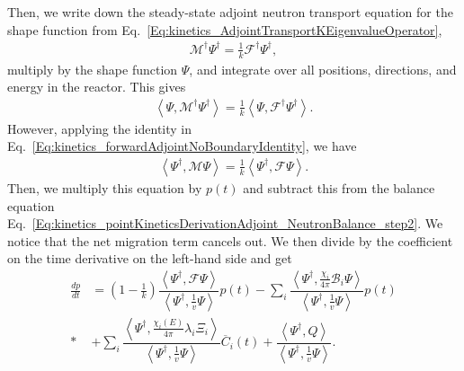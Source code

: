 Then, we write down the steady-state adjoint neutron transport equation for the shape function from Eq.~\eqref{Eq:kinetics_AdjointTransportKEigenvalueOperator},
\begin{align}
  \mathcal{M}^\dagger \Psi^\dagger = \frac{1}{k} \mathcal{F}^\dagger \Psi^\dagger , \nonumber
\end{align}
multiply by the shape function $\Psi$, and integrate over all positions, directions, and energy in the reactor. This gives
\begin{align}
  \left< \Psi, \mathcal{M}^\dagger \Psi^\dagger \right> = \frac{1}{k} \left< \Psi, \mathcal{F}^\dagger \Psi^\dagger \right> . \nonumber
\end{align}
However, applying the identity in Eq.~\eqref{Eq:kinetics_forwardAdjointNoBoundaryIdentity}, we have
\begin{align}
  \left< \Psi^\dagger, \mathcal{M} \Psi \right> = \frac{1}{k} \left< \Psi^\dagger, \mathcal{F} \Psi \right> .
\end{align}
Then, we multiply this equation by $p(t)$ and subtract this from the balance equation Eq.~\eqref{Eq:kinetics_pointKineticsDerivationAdjoint_NeutronBalance_step2}. We notice that the net migration term cancels out. We then divide by the coefficient on the time derivative on the left-hand side and get
\begin{align}
   \frac{dp}{dt}  
  &=  \left( 1 - \frac{1}{k} \right) \dfrac{ \left< \Psi^\dagger, \mathcal{F} \Psi \right> }{ \left< \Psi^\dagger, \frac{1}{v} \Psi \right> } p(t)  - \sum_i \dfrac{ \left< \Psi^\dagger, \frac{\chi_i}{4\pi} \mathcal{B}_i \Psi \right> }{ \left< \Psi^\dagger, \frac{1}{v} \Psi \right> }  p(t) \nonumber \\*
  &+ \sum_i \dfrac{ \left< \Psi^\dagger, \frac{\chi_i(E)}{4\pi} \lambda_i \Xi_i \right> }{ \left< \Psi^\dagger, \frac{1}{v} \Psi \right> } \overline{C}_i(t) + \dfrac{ \left< \Psi^\dagger, Q \right> }{ \left< \Psi^\dagger, \frac{1}{v} \Psi \right> }. \label{Eq:kinetics_pointKineticsDerivationAdjoint_NeutronBalance_step3}
\end{align}


